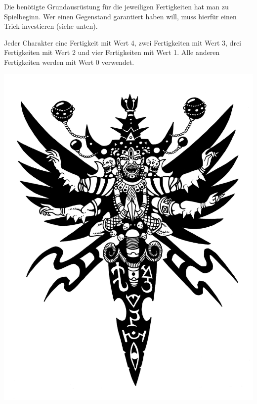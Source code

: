 \documentclass{tufte-handout}
\begin{document}
Die benötigte Grundausrüstung für die jeweiligen Fertigkeiten hat man
zu Spielbeginn. Wer einen Gegenstand garantiert haben will, muss
hierfür einen Trick investieren (siehe unten).

Jeder Charakter eine Fertigkeit mit Wert 4, zwei Fertigkeiten mit Wert
3, drei Fertigkeiten mit Wert 2 und vier Fertigkeiten mit Wert 1. Alle
anderen Fertigkeiten werden mit Wert 0 verwendet.

\clearpage

\begin{marginfigure}
\includegraphics{pazuzu_dagger_by_tillinghast23-d392ool.jpg}
\end{marginfigure}
\end{document}
